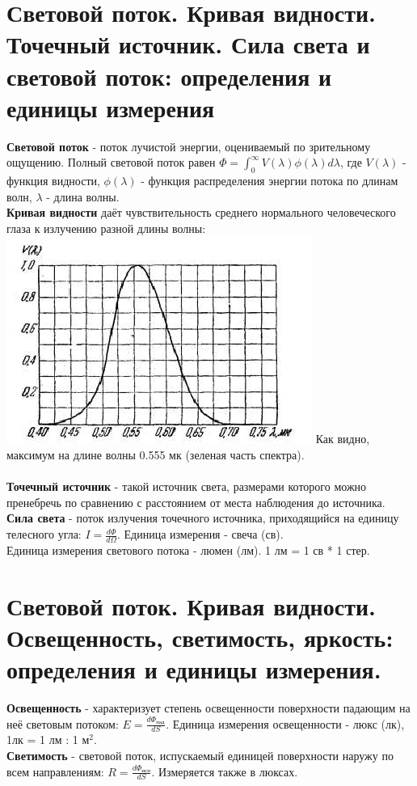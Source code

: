 \documentclass[14pt]{extarticle}
\begin{document}
\section{Световой поток. Кривая видности. Точечный источник.
Сила света и световой поток:
определения и единицы измерения}
\textbf{Световой поток} - поток лучистой энергии, оцениваемый
по зрительному ощущению. Полный световой поток равен 
$\Phi = \int_{0}^{\infty} V(\lambda) \phi(\lambda) d\lambda$,
где $V(\lambda)$ - функция видности, $\phi(\lambda)$ - 
функция распределения энергии потока по длинам волн, 
$\lambda$ - длина волны.\\
\textbf{Кривая видности} даёт чувствительность среднего нормального
человеческого глаза к излучению разной длины волны:
\includegraphics{visibility_curve.png} 
Как видно, максимум на длине волны 0.555 мк (зеленая часть спектра).
\\\\
\textbf{Точечный источник} - такой источник света, размерами
которого можно пренебречь по сравнению с расстоянием от места
наблюдения до источника.\\
\textbf{Сила света} - поток излучения точечного источника, 
приходящийся на единицу телесного угла: 
$I = \frac{d\Phi}{d\Omega}$. Единица измерения - свеча (св).\\
Единица измерения светового потока - люмен (лм).
1 лм = 1 св * 1 стер.
\section{Световой поток. Кривая видности. Освещенность, светимость, яркость: определения и
единицы измерения.}
\textbf{Освещенность} - характеризует степень освещенности 
поверхности падающим на неё световым потоком: 
$E = \frac{d\Phi_{пад}}{dS}$. Единица измерения освещенности - 
люкс (лк), 1лк = 1 лм : 1 $м^2$.\\
\textbf{Светимость} - световой поток, испускаемый единицей 
поверхности наружу по всем направлениям: 
$R = \frac{d\Phi_{исп}}{dS}$. Измеряется также в люксах. 
\end{document}
